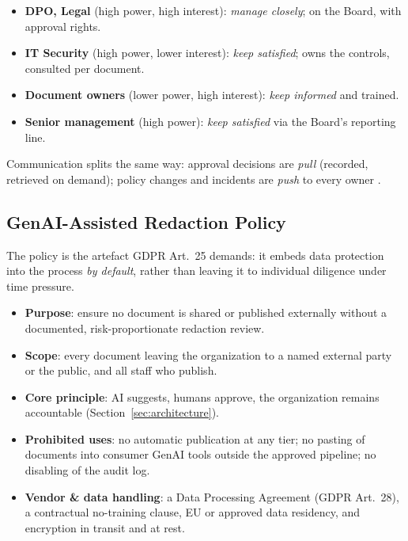 \documentclass[12pt,a4paper]{article}
\begin{document}
\begin{itemize}
  \item \textbf{DPO, Legal} (high power, high interest): \emph{manage closely}; on the Board, with approval rights.
  \item \textbf{IT Security} (high power, lower interest): \emph{keep satisfied}; owns the controls, consulted per document.
  \item \textbf{Document owners} (lower power, high interest): \emph{keep informed} and trained.
  \item \textbf{Senior management} (high power): \emph{keep satisfied} via the Board's reporting line.
\end{itemize}

Communication splits the same way: approval decisions are \emph{pull} (recorded, retrieved on demand); policy changes and incidents are \emph{push} to every owner \cite{falchi_slides}.

\subsection{GenAI-Assisted Redaction Policy}

The policy is the artefact GDPR Art.~25 demands: it embeds data protection into the process \emph{by default}, rather than leaving it to individual diligence under time pressure.

\begin{definitionbox}
\begin{itemize}
  \item \textbf{Purpose}: ensure no document is shared or published externally without a documented, risk-proportionate redaction review.
  \item \textbf{Scope}: every document leaving the organization to a named external party or the public, and all staff who publish.
  \item \textbf{Core principle}: AI suggests, humans approve, the organization remains accountable (Section~\ref{sec:architecture}).
  \item \textbf{Prohibited uses}: no automatic publication at any tier; no pasting of documents into consumer GenAI tools outside the approved pipeline; no disabling of the audit log.
  \item \textbf{Vendor \& data handling}: a Data Processing Agreement (GDPR Art.~28), a contractual no-training clause, EU or approved data residency, and encryption in transit and at rest.
\end{itemize}
\end{definitionbox}
\end{document}

